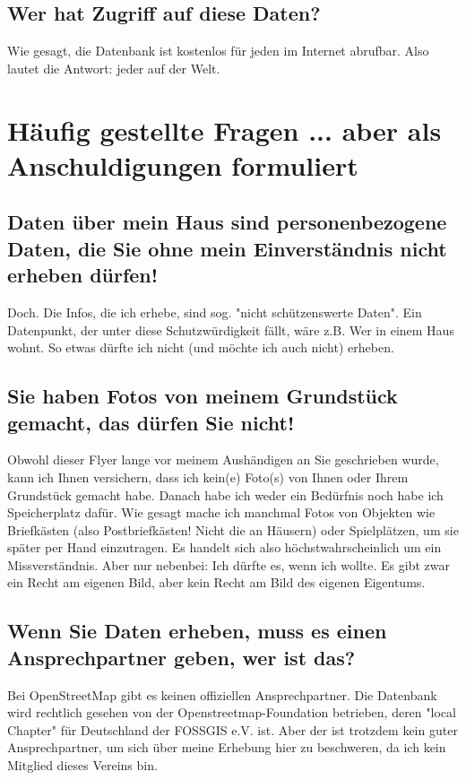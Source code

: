 \documentclass[10pt,foldmark,notumble]{leaflet}
\begin{document}
    \subsection{Wer hat Zugriff auf diese Daten?}
    Wie gesagt, die Datenbank ist kostenlos für jeden im Internet abrufbar.
    Also lautet die Antwort: jeder auf der Welt.


    \section{Häufig gestellte Fragen {\small ... aber als Anschuldigungen formuliert}}
    \subsection{Daten über mein Haus sind personenbezogene Daten, die Sie ohne mein Einverständnis nicht erheben dürfen!}
    Doch.
    Die Infos, die ich erhebe, sind sog. "nicht schützenswerte Daten".
    Ein Datenpunkt, der unter diese Schutzwürdigkeit fällt, wäre z.B. Wer in einem Haus wohnt.
    So etwas dürfte ich nicht (und möchte ich auch nicht) erheben.

    \subsection{Sie haben Fotos von meinem Grundstück gemacht, das dürfen Sie nicht!}
    Obwohl dieser Flyer lange vor meinem Aushändigen an Sie geschrieben wurde, kann ich Ihnen versichern, dass ich kein(e) Foto(s) von Ihnen oder Ihrem Grundstück gemacht habe.
    Danach habe ich weder ein Bedürfnis noch habe ich Speicherplatz dafür.
    Wie gesagt mache ich manchmal Fotos von Objekten wie Briefkästen (also Postbriefkästen! Nicht die an Häusern) oder Spielplätzen, um sie später per Hand einzutragen.
    Es handelt sich also höchstwahrscheinlich um ein Missverständnis.
    Aber nur nebenbei: Ich dürfte es, wenn ich wollte.
    Es gibt zwar ein Recht am eigenen Bild, aber kein Recht am Bild des eigenen Eigentums.

    \subsection{Wenn Sie Daten erheben, muss es einen Ansprechpartner geben, wer ist das?}
    Bei OpenStreetMap gibt es keinen offiziellen Ansprechpartner.
    Die Datenbank wird rechtlich gesehen von der Openstreetmap-Foundation betrieben, deren "local Chapter" für Deutschland der FOSSGIS e.V. ist.
    Aber der ist trotzdem kein guter Ansprechpartner, um sich über meine Erhebung hier zu beschweren, da ich kein Mitglied dieses Vereins bin.
\end{document}
